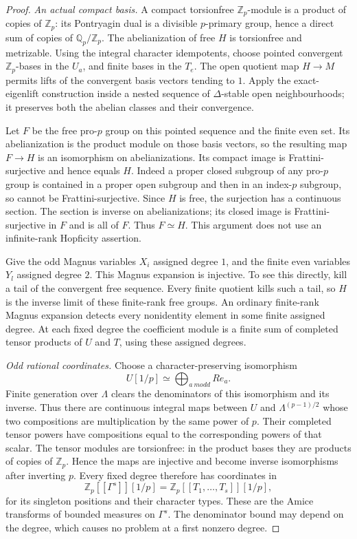 \begin{proof}
\emph{An actual compact basis.}
A compact torsionfree $\mathbb Z_p$-module is a product of copies of
$\mathbb Z_p$: its Pontryagin dual is a divisible $p$-primary group,
hence a direct sum of copies of $\mathbb Q_p/\mathbb Z_p$.
The abelianization of free $H$ is torsionfree and metrizable.
Using the integral character idempotents, choose pointed convergent
$\mathbb Z_p$-bases in the $U_a$, and finite bases in the $T_e$.
The open quotient map $H\to M$ permits lifts of the convergent
basis vectors tending to $1$. Apply the exact-eigenlift construction
inside a nested sequence of $\Delta$-stable open neighbourhoods;
it preserves both the abelian classes and their convergence.

Let $F$ be the free pro-$p$ group on this pointed sequence and the
finite even set. Its abelianization is the product module on those
basis vectors, so the resulting map $F\to H$ is an isomorphism on
abelianizations. Its compact image is Frattini-surjective and hence
equals $H$. Indeed a proper closed subgroup of any pro-$p$ group is
contained in a proper open subgroup and then in an index-$p$ subgroup,
so cannot be Frattini-surjective. Since $H$ is free, the surjection
has a continuous section. The section is inverse on abelianizations;
its closed image is Frattini-surjective in $F$ and is all of $F$.
Thus $F\simeq H$. This argument does not use an infinite-rank
Hopficity assertion.

Give the odd Magnus variables $X_i$ assigned degree $1$, and the
finite even variables $Y_l$ assigned degree $2$. This Magnus
expansion is injective. To see this directly, kill a tail of the
convergent free sequence. Every finite quotient kills such a tail,
so $H$ is the inverse limit of these finite-rank free groups.
An ordinary finite-rank Magnus expansion detects every nonidentity
element in some finite assigned degree. At each fixed degree the
coefficient module is a finite sum of completed tensor products of
$U$ and $T$, using these assigned degrees.

\emph{Odd rational coordinates.}
Choose a character-preserving isomorphism
\[
 U[1/p]\simeq\bigoplus_{a\ {
m odd}}Re_a.
\]
Finite generation over $\Lambda$ clears the denominators of this
isomorphism and its inverse. Thus there are continuous integral
maps between $U$ and $\Lambda^{(p-1)/2}$ whose two compositions are
multiplication by the same power of $p$. Their completed tensor
powers have compositions equal to the corresponding powers of that
scalar. The tensor modules are torsionfree: in the product bases
they are products of copies of $\mathbb Z_p$. Hence the maps are
injective and become inverse isomorphisms after inverting $p$.
Every fixed degree therefore has coordinates in
\[
 \mathbb Z_p[[\Gamma^s]][1/p]
   =\mathbb Z_p[[T_1,\ldots,T_s]][1/p],                       \tag{GM.2}
\]
for its singleton positions and their character types. These are
the Amice transforms of bounded measures on $\Gamma^s$.
The denominator bound may depend on the degree, which causes no
problem at a first nonzero degree.


\end{proof}
